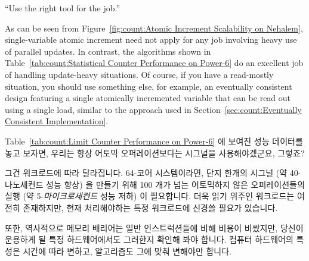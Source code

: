 \begin{enumerate}
	``Use the right tool for the job.''

	As can be seen from
	Figure~\ref{fig:count:Atomic Increment Scalability on Nehalem},
	single-variable atomic increment need not apply for any job
	involving heavy use of parallel updates.
	In contrast, the algorithms shown in
	Table~\ref{tab:count:Statistical Counter Performance on Power-6}
	do an excellent job of handling update-heavy situations.
	Of course, if you have a read-mostly situation, you should
	use something else, for example, an eventually consistent design
	featuring a single atomically incremented
	variable that can be read out using a single load,
	similar to the approach used in
	Section~\ref{sec:count:Eventually Consistent Implementation}.
	\fi

\QuickQ{}
	Table~\ref{tab:count:Limit Counter Performance on Power-6} 에 보여진
	성능 데이터를 놓고 보자면, 우리는 항상 어토믹 오퍼레이션보다는 시그널을
	사용해야겠군요, 그렇죠?

\QuickA{}
	그건 워크로드에 따라 달라집니다.
	64-코어 시스템이라면, 단지 한개의 시그널 (약 40-나노세컨드 성능 향상)
	을 만들기 위해 100 개가 넘는 어토믹하지 않은 오퍼레이션들의 실행 (약
	5-\emph{마이크로세컨드} 성능 저하) 이 필요합니다.
	더욱 읽기 위주인 워크로드는 여전히 존재하지만, 현재 처리해야하는 특정
	워크로드에 신경쓸 필요가 있습니다.

	또한, 역사적으로 메모리 배리어는 일반 인스트럭션들에 비해 비용이
	비쌌지만, 당신이 운용하게 될 특정 하드웨어에서도 그러한지 확인해 봐야
	합니다.
	컴퓨터 하드웨어의 특성은 시간에 따라 변하고, 알고리즘도 그에 맞춰
	변해야만 합니다.

\end{enumerate}
